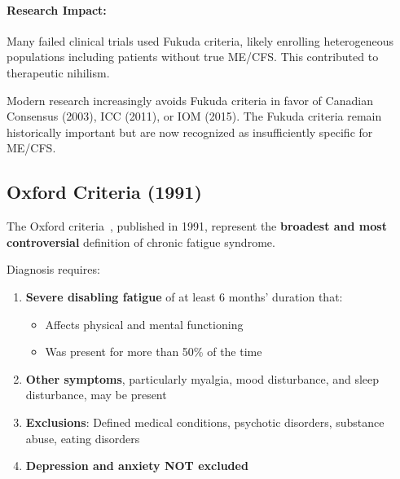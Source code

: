 \begin{warning}
\paragraph{Research Impact:}
Many failed clinical trials used Fukuda criteria, likely enrolling heterogeneous populations including patients without true ME/CFS. This contributed to therapeutic nihilism.
\end{warning}

\begin{observation}
Modern research increasingly avoids Fukuda criteria in favor of Canadian Consensus (2003), ICC (2011), or IOM (2015). The Fukuda criteria remain historically important but are now recognized as insufficiently specific for ME/CFS.
\end{observation}

\subsection{Oxford Criteria (1991)}

The Oxford criteria~\cite{Sharpe1991oxford}, published in 1991, represent the \textbf{broadest and most controversial} definition of chronic fatigue syndrome.

\begin{requirement}
\label{req:oxford}
Diagnosis requires:
\begin{enumerate}
    \item \textbf{Severe disabling fatigue} of at least 6 months' duration that:
    \begin{itemize}
        \item Affects physical and mental functioning
        \item Was present for more than 50\% of the time
    \end{itemize}
    \item \textbf{Other symptoms}, particularly myalgia, mood disturbance, and sleep disturbance, may be present
    \item \textbf{Exclusions}: Defined medical conditions, psychotic disorders, substance abuse, eating disorders
    \item \textbf{Depression and anxiety NOT excluded}
\end{enumerate}
\end{requirement}


